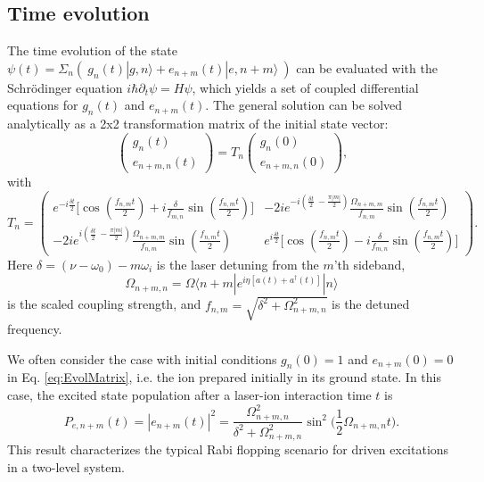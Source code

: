 \subsection{Time evolution}
The time evolution of the state $\psi (t) = \Sigma_n ( \ g_n (t) |g, n\rangle + e_{n+m} (t) |e, n + m\rangle \ )$ can be evaluated with the Schr\"{o}dinger equation $ i \hbar \partial_t \psi = H \psi$, which yields a set of coupled differential equations for $g_n (t)$ and $e_{n+m} (t)$. The general solution can be solved analytically as a 2x2 transformation matrix of the initial state vector:     
\begin{equation}
\begin{pmatrix} g_n (t) \\ e_{n+m,n}(t) \end{pmatrix} = T_n \begin{pmatrix} g_n (0) \\ e_{n+m,n} (0) \end{pmatrix} \text{,}
\label{eq:stateEvol}
\end{equation}
with
\begin{equation}
T_n = \begin{pmatrix} e^{-i \frac{\delta t}{2}} \big[ \cos (\frac{f_{n,m} t}{2}) + i \frac{\delta}{f_{m,n}} \sin (\frac{f_{n,m} t}{2}) \big ] & 
- 2 i e^{-i (\frac{\delta t}{2} \ - \frac{\pi |m|}{2} ) } \frac{\Omega_{n+m,m}}{f_{n,m}} \sin (\frac{f_{n,m} t}{2}) \\
 - 2 i e^{i (\frac{\delta t}{2} \ - \frac{\pi |m|}{2} ) } \frac{\Omega_{n+m,m}}{f_{n,m}} \sin (\frac{f_{n,m} t}{2}) &  
 e^{i \frac{\delta t}{2}} \big[ \cos (\frac{f_{n,m} t}{2}) - i \frac{\delta}{f_{m,n}} \sin (\frac{f_{n,m} t}{2}) \big ]
\end{pmatrix}
\text{.}
\label{eq:EvolMatrix}
\end{equation}
Here $\delta = ( \nu - \omega_0 ) - m \omega_i$ is the laser detuning from the $m$'th sideband, 
\begin{equation}
\Omega_{n+m, n} = \Omega \langle n + m | e^{ i \eta [a(t) + a^{\dagger}(t) ] } | n \rangle 
\label{eq:RabiFreq}
\end{equation}
is the scaled coupling strength, and $f_{n,m} = \sqrt{\delta^2 + \Omega_{n+m,n}^2}$ is the detuned frequency. 

We often consider the case with initial conditions $g_n (0) = 1$ and $e_{n+m} (0) = 0$ in Eq. \ref{eq:EvolMatrix}, i.e. the ion prepared initially in its ground state. In this case, the excited state population after a laser-ion interaction time $t$ is 
\begin{equation}
P_{e,n+m} (t) = | e_{n+m} (t) |^2 = \frac{ \Omega_{n+m, n}^2 }{ \delta^2 + \Omega_{n+m, n}^2 } \sin^2 \big( \frac{1}{2} \Omega_{n+m, n} t \big) \text{.}
\label{eq:numstatepop}
\end{equation}
This result characterizes the typical Rabi flopping scenario for driven excitations in a two-level system. 


